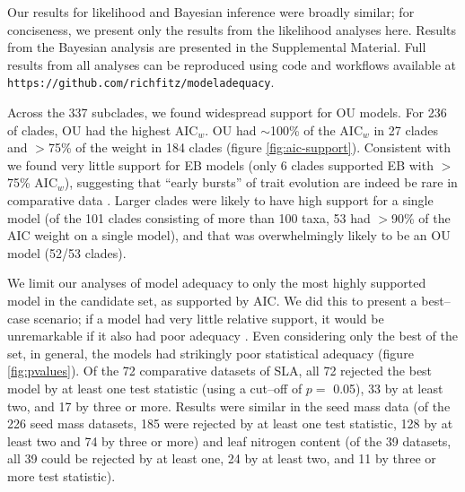 \documentclass[a4paper,11pt]{article}
\begin{document}
Our results for likelihood and Bayesian inference were broadly similar; for conciseness, we present only the results from the likelihood analyses here. Results from the Bayesian analysis are presented in the Supplemental Material. Full results from all analyses can be reproduced using code and workflows available at \texttt{https://github.com/richfitz/modeladequacy}. 

Across the 337 subclades, we found widespread support for OU
models. For 236 of clades, OU had the highest AIC$_w$.
OU had $\sim$100\% of the AIC$_w$ in 27 clades and $>$75\% of the weight in 184 clades (figure \ref{fig:aic-support}). Consistent with \citet{Harmon2010} we found very little support for EB models (only 6 clades supported EB with $>$75\% AIC$_w$), suggesting that ``early bursts'' of trait evolution are indeed be rare in comparative data \citep[but see][]{SlaterPennell}. Larger clades were
likely to have high support for a single model (of the 101 clades consisting of more than 100 taxa, 53 had $>$90\% of the AIC weight on a single model),
and that was overwhelmingly likely to be an OU model (52/53 clades). 

We limit our analyses of model adequacy to only the most highly supported model in the candidate set, as supported by AIC. We did this to present a best--case scenario; if a model had very little relative support, it would be unremarkable if it also had poor adequacy \citep[but see][]{Ripplinger2010}. Even considering only the best of the set, in general, the models had strikingly poor statistical adequacy (figure \ref{fig:pvalues}). 
Of the 72 comparative datasets of SLA, all 72 rejected the best model by at least one test statistic (using a cut--off of $p=$ 0.05), 33 by at least two, and 17 by three or more. 
Results were similar in the seed mass data (of the 226 seed mass datasets, 185 were rejected by at least one test statistic, 128 by at least two and 74 by three or more) and leaf nitrogen content 
(of the 39 datasets, all 39 could be rejected by at least one, 24 by at least two, and 11 by three or more test statistic). 
\end{document}
